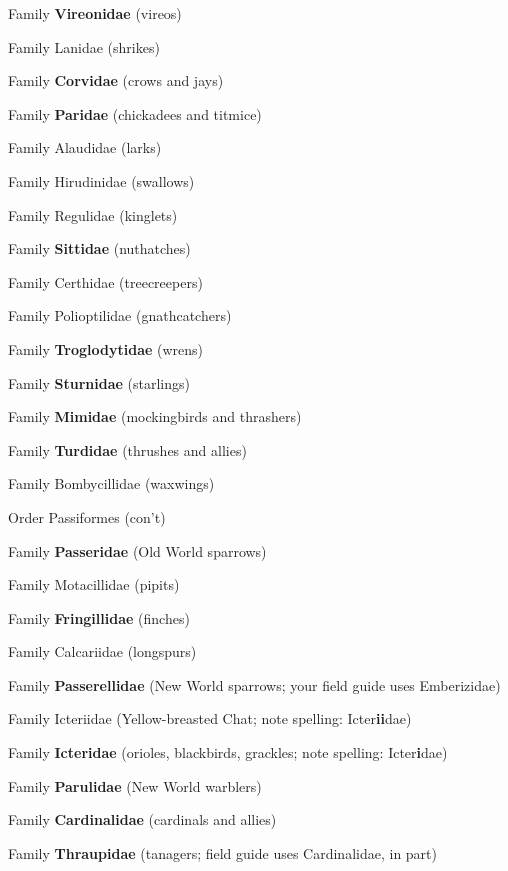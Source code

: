 \documentclass[10pt]{article}
\newlength\mylength
\newcommand*{\resetparindent}{\setlength{\parindent}{0pt}}
\newcommand*{\growparindent}{\addtolength{\parindent}{\mylength}}
\newcommand*{\reduceparindent}{\addtolength{\parindent}{-1\mylength}}
\begin{document}
\begin{spacing}{1.35}
	  	Family \textbf{Vireonidae} (vireos)
	  	
	  	Family Lanidae (shrikes)
	  	
	  	Family \textbf{Corvidae} (crows and jays)
	  	
	  	Family \textbf{Paridae} (chickadees and titmice)
	  	
	  	Family Alaudidae (larks)
	  	
	  	Family Hirudinidae (swallows)
	  	
	  	Family Regulidae (kinglets)
	  	
	  	Family \textbf{Sittidae} (nuthatches)
	  	
	  	Family Certhidae (treecreepers)
	  	
	  	Family Polioptilidae (gnathcatchers)
	  	
	  	Family \textbf{Troglodytidae} (wrens)
	  	
	  	Family \textbf{Sturnidae} (starlings)
	  	
	  	Family \textbf{Mimidae} (mockingbirds and thrashers)
	  	
	  	Family \textbf{Turdidae} (thrushes and allies)
	  	
	  	Family Bombycillidae (waxwings)
	  	
	  \reduceparindent
	  
	  Order Passiformes (con't)
	  
	  	\growparindent

	  	Family \textbf{Passeridae} (Old World sparrows)
	  	
	  	Family Motacillidae (pipits)
	  	
	  	Family \textbf{Fringillidae} (finches)
	  	
	  	Family Calcariidae (longspurs)
	  	
	  	Family \textbf{Passerellidae} (New World sparrows; your field guide uses Emberizidae)
	  	
	  	Family Icteriidae (Yellow-breasted Chat; note spelling: Icter\textbf{ii}dae)
	  	
	  	Family \textbf{Icteridae} (orioles, blackbirds, grackles; note spelling: Icter\textbf{i}dae)
	  	
	  	Family \textbf{Parulidae} (New World warblers)
	  	
	  	Family \textbf{Cardinalidae} (cardinals and allies)
	  	
	  	Family \textbf{Thraupidae} (tanagers; field guide uses Cardinalidae, in part)
	  	
	  	
      
      
     
\resetparindent


\resetparindent

\end{spacing}
\end{document}

